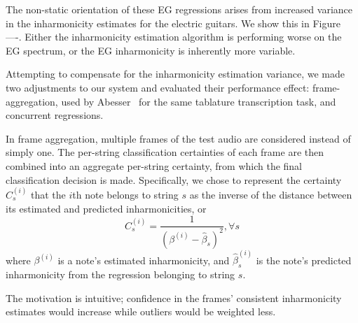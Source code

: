 \documentclass[12pt]{cmuthesis}
\begin{document}
The non-static orientation of these EG regressions arises from increased variance in the inharmonicity estimates for the electric guitars. We show this in Figure ----. Either the inharmonicity estimation algorithm is performing worse on the EG spectrum, or the EG inharmonicity is inherently more variable. 

Attempting to compensate for the inharmonicity estimation variance, we made two adjustments to our system and evaluated their performance effect: frame-aggregation, used by Abesser~\cite{abesser2012} for the same tablature transcription task, and concurrent regressions. 

In frame aggregation, multiple frames of the test audio are considered instead of simply one. The per-string classification certainties of each frame are then combined into an aggregate per-string certainty, from which the final classification decision is made. Specifically, we chose to represent the certainty $C_s^{(i)}$ that the $i$th note belongs to string $s$ as the inverse of the distance between its estimated and predicted inharmonicities, or
\begin{equation}
C_s^{(i)} = \frac{1}{(\beta^{(i)} - \hat{\beta}_{s})^2}, \forall{s}
\end{equation}
where $\beta^{(i)}$ is a note's estimated inharmonicity, and $\hat{\beta}_s^{(i)}$ is the note's predicted inharmonicity from the regression belonging to string $s$.

The motivation is intuitive; confidence in the frames' consistent inharmonicity estimates would increase while outliers would be weighted less.

\end{document}
